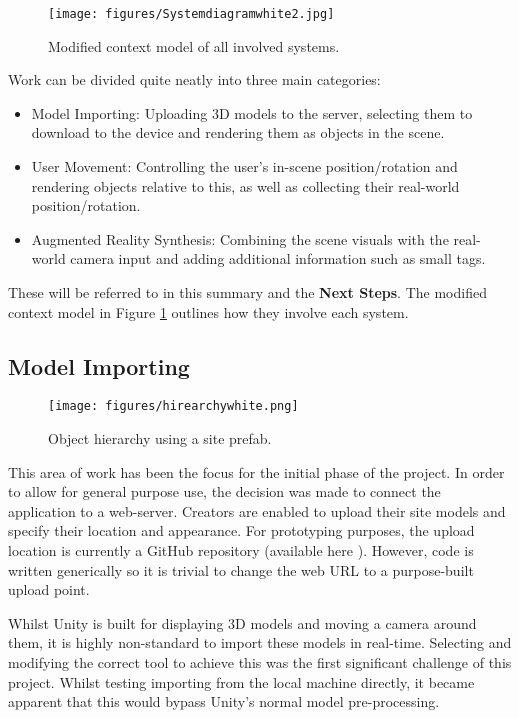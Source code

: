 \documentclass{article}
\begin{document}
\begin{figure}[H]
    \centering
    \texttt{[image: figures/Systemdiagramwhite2.jpg]}
    \caption{Modified context model of all involved systems.}
    \label{fig:context}
\end{figure}
Work can be divided quite neatly into three main categories: 
\begin{itemize}
    \item Model Importing: Uploading 3D models to the server, selecting them to download to the device and rendering them as objects in the scene. 
    \item User Movement: Controlling the user's in-scene position/rotation and rendering objects relative to this, as well as collecting their real-world position/rotation.
    \item Augmented Reality Synthesis: Combining the scene visuals with the real-world camera input and adding additional information such as small tags. 
\end{itemize}

These will be referred to in this summary and the \textbf{Next Steps}. The modified context model in Figure \ref{fig:context} outlines how they involve each system.

\subsection{Model Importing}

\begin{wrapfigure}{r}{0.38\textwidth}
    \centering
    \texttt{[image: figures/hirearchywhite.png]} 
    \caption{Object hierarchy using a site prefab.}
    \label{fig:objecthirearchy}
\end{wrapfigure}

This area of work has been the focus for the initial phase of the project. In order to allow for general purpose use, the decision was made to connect the application to a web-server. Creators are enabled to upload their site models and specify their location and appearance. For prototyping purposes, the upload location is currently a GitHub repository (available here \cite{repo}).
However, code is written generically so it is trivial to change the web URL to a purpose-built upload point.

Whilst Unity is built for displaying 3D models and moving a camera around them, it is highly non-standard to import these models in real-time. Selecting and modifying the correct tool to achieve this was the first significant challenge of this project. Whilst testing importing from the local machine directly, it became apparent that this would bypass Unity's normal model pre-processing. 
\end{document}
